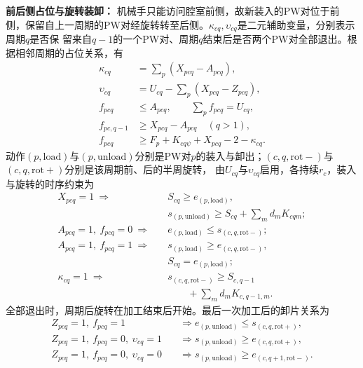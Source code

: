 \noindent\textbf{前后侧占位与旋转装卸：}
机械手只能访问腔室前侧，故新装入的PW对位于前侧，保留自上一周期的PW对经旋转转至后侧。$\kappa_{cq},\upsilon_{cq}$是二元辅助变量，分别表示周期$q$是否保
留来自$q-1$的一个PW对、周期$q$结束后是否两个PW对全部退出。根据相邻周期的占位关系，有
\begin{equation}
\begin{aligned}
\kappa_{cq}&=\sum_p(X_{pcq}-A_{pcq}),\\
\upsilon_{cq}&=U_{cq}-\sum_p(X_{pcq}-Z_{pcq}),\\
f_{pcq}&\le A_{pcq},\qquad\sum_pf_{pcq}=U_{cq},\\
f_{pc,q-1}&\ge X_{pcq}-A_{pcq}\quad(q>1),\\
f_{pcq}&\ge F_p+K_{cq\psi}+X_{pcq}-2-\kappa_{cq}.
\end{aligned}
\label{eq:cycle-side-cn}
\end{equation}
动作$(p,\mathrm{load})$与$(p,\mathrm{unload})$分别是PW对$p$的装入与卸出；$(c,q,\mathrm{rot-})$与$(c,q,\mathrm{rot+})$分别是该周期前、后的半周旋转，
由$U_{cq}$与$\upsilon_{cq}$启用，各持续$r_c$，装入与旋转的时序约束为
\begin{equation}
\begin{aligned}
X_{pcq}=1\ \Rightarrow\quad
&S_{cq}\ge e_{(p,\mathrm{load})},\\
&s_{(p,\mathrm{unload})}\ge S_{cq}+\sum_m d_mK_{cqm};\\
A_{pcq}=1,\ f_{pcq}=0\ \Rightarrow\quad
&e_{(p,\mathrm{load})}\le s_{(c,q,\mathrm{rot-})};\\
A_{pcq}=1,\ f_{pcq}=1\ \Rightarrow\quad
&s_{(p,\mathrm{load})}\ge e_{(c,q,\mathrm{rot-})},\\
&S_{cq}=e_{(p,\mathrm{load})};\\
\kappa_{cq}=1\ \Rightarrow\quad
&s_{(c,q,\mathrm{rot-})}\ge S_{c,q-1}\\
&\qquad+\sum_m d_mK_{c,q-1,m}.
\end{aligned}
\label{eq:cycle-load-cn}
\end{equation}
全部退出时，周期后旋转在加工结束后开始。最后一次加工后的卸片关系为
\begin{equation}
\begin{aligned}
Z_{pcq}=1,\ f_{pcq}=1\quad
&\Rightarrow e_{(p,\mathrm{unload})}\le s_{(c,q,\mathrm{rot+})},\\
Z_{pcq}=1,\ f_{pcq}=0,\ \upsilon_{cq}=1\quad
&\Rightarrow s_{(p,\mathrm{unload})}\ge e_{(c,q,\mathrm{rot+})},\\
Z_{pcq}=1,\ f_{pcq}=0,\ \upsilon_{cq}=0\quad
&\Rightarrow s_{(p,\mathrm{unload})}\ge e_{(c,q+1,\mathrm{rot-})}.
\end{aligned}
\label{eq:cycle-unload-cn}
\end{equation}
